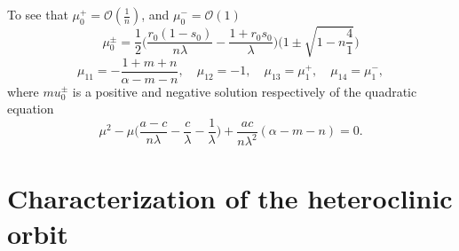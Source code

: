 \documentclass[a4paper,11pt]{article}
\def\tth{{\tilde{\theta}}}
\def\tu{{\tilde{u}}}
\def\BO{{\mathcal{O}}}
\begin{document}
To see that $\mu_0^+ = \BO(\frac{1}{n})$, and $\mu_0^-=\BO(1)$ 
 $$ \mu_0^\pm = \frac{1}{2}\Big(\frac{r_0(1-s_0)}{n\lambda}-\frac{1+r_0s_0}{\lambda}\Big)\Big(1\pm \sqrt{1-n\frac{4}{1}}\Big)$$
\begin{equation}
 \mu_{11}=-\frac{1+m+n}{\alpha-m-n}, \quad \mu_{12}=-1, \quad \mu_{13}=\mu_1^+, \quad \mu_{14}=\mu_1^-,
\end{equation}
 where $mu_0^\pm$ is a positive and negative solution respectively of the quadratic equation
 $$ \mu^2 - \mu\Big(\frac{a-c}{n\lambda}-\frac{c}{\lambda} - \frac{1}{\lambda}\Big) + \frac{ac}{n\lambda^2}(\alpha-m-n)=0.$$ 








\section{Characterization of the heteroclinic orbit}

% 
% 
\end{document}

